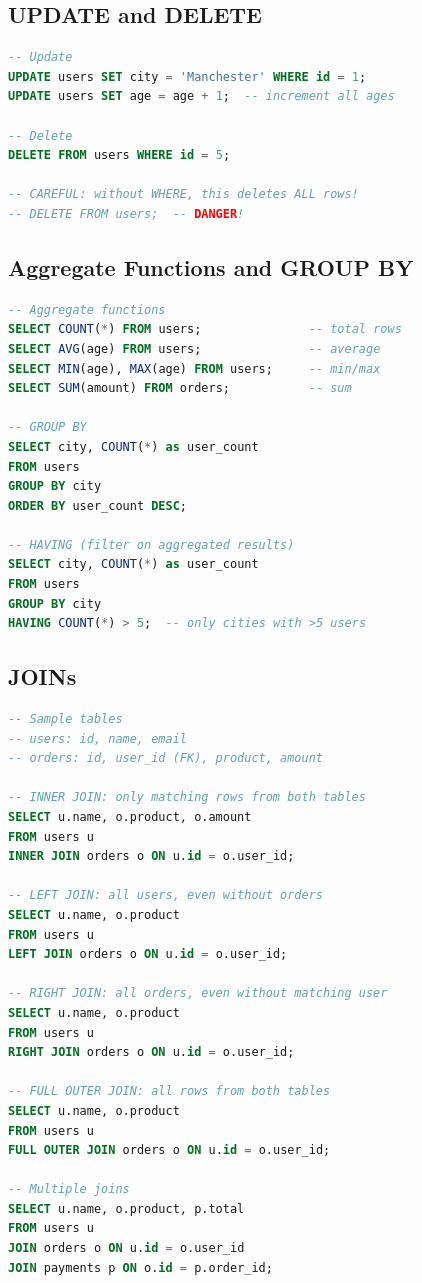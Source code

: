 \documentclass[12pt, a4paper, oneside]{book}
\begin{document}
\subsection{UPDATE and DELETE}

\begin{lstlisting}[language=SQL, caption={Updating and deleting}]
-- Update
UPDATE users SET city = 'Manchester' WHERE id = 1;
UPDATE users SET age = age + 1;  -- increment all ages

-- Delete
DELETE FROM users WHERE id = 5;

-- CAREFUL: without WHERE, this deletes ALL rows!
-- DELETE FROM users;  -- DANGER!
\end{lstlisting}

\subsection{Aggregate Functions and GROUP BY}

\begin{lstlisting}[language=SQL, caption={Aggregation}]
-- Aggregate functions
SELECT COUNT(*) FROM users;               -- total rows
SELECT AVG(age) FROM users;               -- average
SELECT MIN(age), MAX(age) FROM users;     -- min/max
SELECT SUM(amount) FROM orders;           -- sum

-- GROUP BY
SELECT city, COUNT(*) as user_count
FROM users
GROUP BY city
ORDER BY user_count DESC;

-- HAVING (filter on aggregated results)
SELECT city, COUNT(*) as user_count
FROM users
GROUP BY city
HAVING COUNT(*) > 5;  -- only cities with >5 users
\end{lstlisting}

\subsection{JOINs}

\begin{lstlisting}[language=SQL, caption={SQL JOINs}]
-- Sample tables
-- users: id, name, email
-- orders: id, user_id (FK), product, amount

-- INNER JOIN: only matching rows from both tables
SELECT u.name, o.product, o.amount
FROM users u
INNER JOIN orders o ON u.id = o.user_id;

-- LEFT JOIN: all users, even without orders
SELECT u.name, o.product
FROM users u
LEFT JOIN orders o ON u.id = o.user_id;

-- RIGHT JOIN: all orders, even without matching user
SELECT u.name, o.product
FROM users u
RIGHT JOIN orders o ON u.id = o.user_id;

-- FULL OUTER JOIN: all rows from both tables
SELECT u.name, o.product
FROM users u
FULL OUTER JOIN orders o ON u.id = o.user_id;

-- Multiple joins
SELECT u.name, o.product, p.total
FROM users u
JOIN orders o ON u.id = o.user_id
JOIN payments p ON o.id = p.order_id;
\end{lstlisting}
\end{document}
